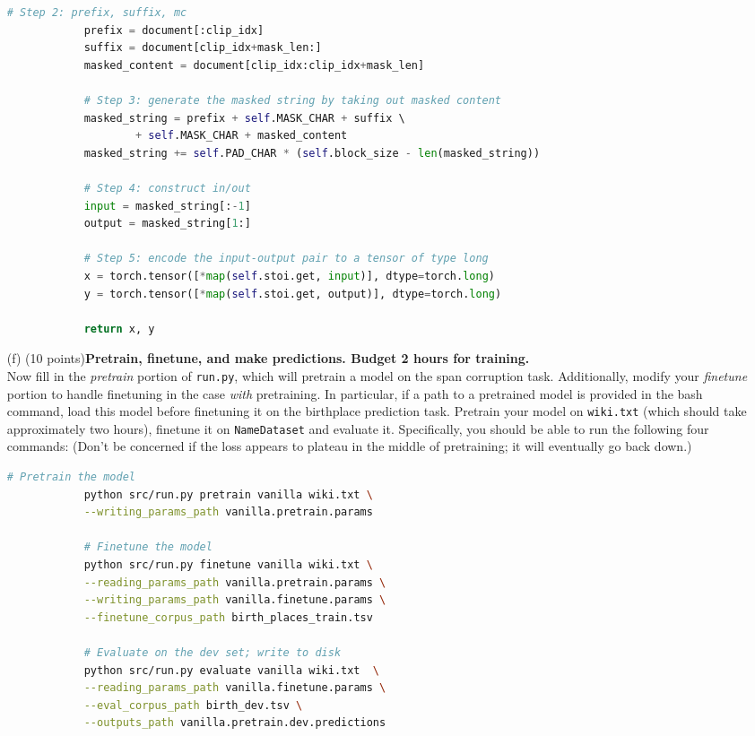 \documentclass[letterpaper,12pt]{article}
\begin{document}
\begin{itemize}
\begin{lstlisting}[language=python, basicstyle=\small\ttfamily]
			# Step 2: prefix, suffix, mc
			prefix = document[:clip_idx]
			suffix = document[clip_idx+mask_len:]
			masked_content = document[clip_idx:clip_idx+mask_len]
			
			# Step 3: generate the masked string by taking out masked content
			masked_string = prefix + self.MASK_CHAR + suffix \ 
					+ self.MASK_CHAR + masked_content
			masked_string += self.PAD_CHAR * (self.block_size - len(masked_string))
			
			# Step 4: construct in/out
			input = masked_string[:-1]
			output = masked_string[1:]
			
			# Step 5: encode the input-output pair to a tensor of type long
			x = torch.tensor([*map(self.stoi.get, input)], dtype=torch.long)
			y = torch.tensor([*map(self.stoi.get, output)], dtype=torch.long)
			
			return x, y
		\end{lstlisting}

	\item[(f)]
		(10 points)\textbf{Pretrain, finetune, and make predictions. Budget 2 hours for training.}\\
		Now fill in the \textit{pretrain} portion of \texttt{run.py}, which will pretrain a model on the span corruption task. Additionally, modify your \textit{finetune} portion to handle finetuning in the case \textit{with} pretraining. In particular, if a path to a pretrained model is provided in the bash command, load this model before finetuning it on the birthplace prediction task.
		Pretrain your model on \texttt{wiki.txt} (which should take approximately two hours), finetune it on \texttt{NameDataset} and evaluate it. Specifically, you should be able to run the following four commands:
		(Don't be concerned if the loss appears to plateau in the middle of pretraining; it will eventually go back down.)
		\begin{lstlisting}[basicstyle=\ttfamily, language=bash]
			# Pretrain the model
			python src/run.py pretrain vanilla wiki.txt \
			--writing_params_path vanilla.pretrain.params
			
			# Finetune the model
			python src/run.py finetune vanilla wiki.txt \
			--reading_params_path vanilla.pretrain.params \
			--writing_params_path vanilla.finetune.params \
			--finetune_corpus_path birth_places_train.tsv
			
			# Evaluate on the dev set; write to disk
			python src/run.py evaluate vanilla wiki.txt  \
			--reading_params_path vanilla.finetune.params \
			--eval_corpus_path birth_dev.tsv \
			--outputs_path vanilla.pretrain.dev.predictions
			

\end{lstlisting}
\end{itemize}
\end{document}
